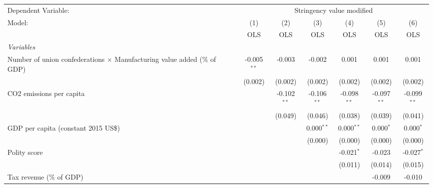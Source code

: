 
\begingroup
\centering
\begin{tabular}{lcccccc}
   \toprule
   Dependent Variable: & \multicolumn{6}{c}{Stringency value modified}\\
   Model:                                                                          & (1)           & (2)           & (3)           & (4)           & (5)           & (6)\\  
                                                                                   &  OLS          & OLS           & OLS           & OLS           & OLS           & OLS\\  
   \midrule
   \emph{Variables}\\
   Number of union confederations $\times$ Manufacturing value added (\% of GDP)   & -0.005$^{**}$ & -0.003        & -0.002        & 0.001         & 0.001         & 0.001\\   
                                                                                   & (0.002)       & (0.002)       & (0.002)       & (0.002)       & (0.002)       & (0.002)\\   
   CO2 emissions per capita                                                        &               & -0.102$^{**}$ & -0.106$^{**}$ & -0.098$^{**}$ & -0.097$^{**}$ & -0.099$^{**}$\\   
                                                                                   &               & (0.049)       & (0.046)       & (0.038)       & (0.039)       & (0.041)\\   
   GDP per capita (constant 2015 US\$)                                             &               &               & 0.000$^{**}$  & 0.000$^{**}$  & 0.000$^{*}$   & 0.000$^{*}$\\   
                                                                                   &               &               & (0.000)       & (0.000)       & (0.000)       & (0.000)\\   
   Polity score                                                                    &               &               &               & -0.021$^{*}$  & -0.023        & -0.027$^{*}$\\   
                                                                                   &               &               &               & (0.011)       & (0.014)       & (0.015)\\   
   Tax revenue (\% of GDP)                                                         &               &               &               &               & -0.009        & -0.010\\   

\end{tabular}
